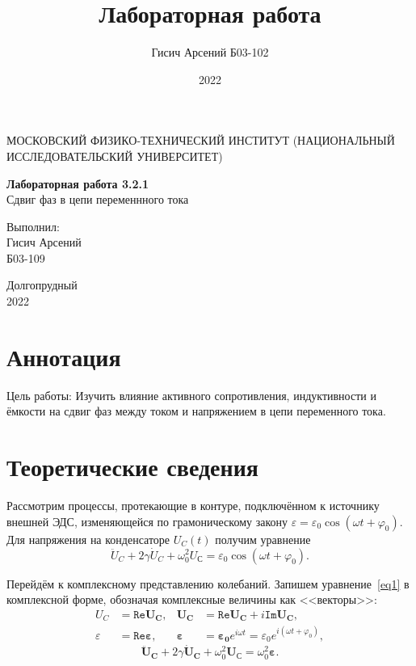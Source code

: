 \documentclass[a4paper, 12pt]{article}
\title{Лабораторная работа}
\author{Гисич Арсений Б03-102}
\date{2022}
\begin{document}
	\begin{center}
		{\large МОСКОВСКИЙ ФИЗИКО-ТЕХНИЧЕСКИЙ ИНСТИТУТ (НАЦИОНАЛЬНЫЙ ИССЛЕДОВАТЕЛЬСКИЙ УНИВЕРСИТЕТ)}
	\end{center}
	\vspace{5 cm}
	{\Large
		\begin{center}
			{\bf Лабораторная работа 3.2.1}\\[0.2 cm]
			Сдвиг фаз в цепи переменнного тока
		\end{center}
	}
	\vspace{4 cm}
	\begin{flushright}
		{\Large Выполнил: \\
			\vspace{0.2 cm}
			Гисич Арсений \\
			\vspace{0.2 cm}
			Б03-109 \\}
	\end{flushright}
	\vspace{9 cm}
	\begin{center}
		Долгопрудный\\[0.1 cm]
		2022
	\end{center}
\thispagestyle{empty}

\section{Аннотация}

Цель работы: Изучить влияние активного сопротивления, индуктивности и ёмкости на сдвиг фаз между током и напряжением в цепи переменного тока.

\section{Теоретические сведения}

Рассмотрим процессы, протекающие в контуре, подключённом к источнику внешней ЭДС, изменяющейся по грамоническому закону $\varepsilon = \varepsilon_0 \cos{(\omega t + \varphi_0)}$. Для напряжения на конденсаторе $U_C(t)$ получим уравнение 
\begin{equation}\label{eq1}
\ddot{U}_C + 2\gamma \dot{U}_C + \omega_0^2U_С = \varepsilon_0\cos{(\omega t + \varphi_0)}.
\end{equation}

Перейдём к комплексному представлению колебаний. Запишем уравнение~\eqref{eq1} в комплексной форме, обозначая комплексные величины как <<векторы>>:
\begin{align}\label{eq2}
U_C & = \mathtt{Re}\mathbf{U_C}, & \mathbf{U_C} & = \mathtt{Re}\mathbf{U_C} + i\mathtt{Im}\mathbf{U_C}, \\
\varepsilon & = \mathtt{Re}\mathbf{\varepsilon}, & \mathbf{\varepsilon} & = \mathbf{\varepsilon_0}e^{i\omega t} = \varepsilon_0e^{i(\omega t + \varphi_0)},
\end{align}
\begin{equation}\label{eq3}
\mathbf{\ddot{U}_C} + 2\gamma \mathbf{\dot{U}_C} + \omega_0^2\mathbf{U_С} = \omega_0^2\mathbf{\varepsilon}.
\end{equation}
\end{document}
